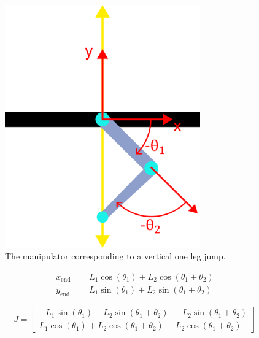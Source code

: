 \begin{figure}[h]
    \centering
    \includegraphics[width=0.75\textwidth]{Images/one_axis_jump.png}
    \caption{The manipulator corresponding to a vertical one leg jump.}
    \label{fig:vertical_manipulator}
\end{figure}

\begin{equation}
    \label{eq:2_link_manipulator}
    \begin{aligned}
        x_{\text{end}} &= L_1 \cos(\theta_1) + L_2 \cos(\theta_1 + \theta_2) \\
        y_{\text{end}} &= L_1 \sin(\theta_1) + L_2 \sin(\theta_1 + \theta_2)
    \end{aligned}
\end{equation}

\begin{equation}
    \label{eq:jacobian_vertical_jump_leg}
    J = \begin{bmatrix} 
    -L_1 \sin(\theta_1) - L_2 \sin(\theta_1 + \theta_2) & -L_2 \sin(\theta_1 + \theta_2) \\
    L_1 \cos(\theta_1) + L_2 \cos(\theta_1 + \theta_2) & L_2 \cos(\theta_1 + \theta_2)
    \end{bmatrix}
\end{equation}

